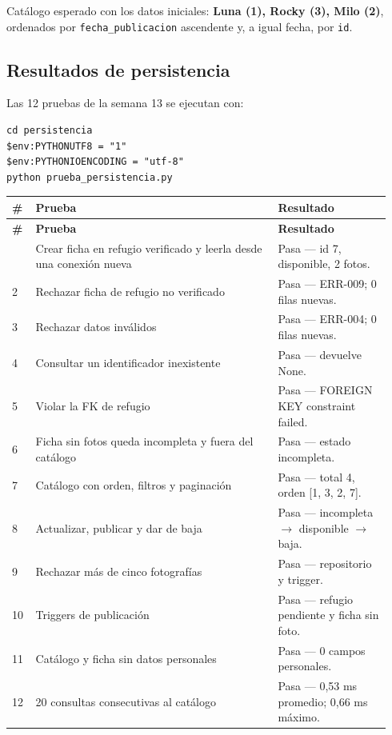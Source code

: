 \documentclass[11pt,a4paper]{article}
\newcommand{\code}[1]{\texttt{#1}}
\newcommand{\thead}[1]{\textbf{#1}}
\begin{document}
Catálogo esperado con los datos iniciales: \textbf{Luna (1), Rocky (3), Milo
(2)}, ordenados por \code{fecha\_publicacion} ascendente y, a igual fecha, por
\code{id}.

\subsection{Resultados de persistencia}

Las 12 pruebas de la semana 13 se ejecutan con:

\begin{lstlisting}
cd persistencia
$env:PYTHONUTF8 = "1"
$env:PYTHONIOENCODING = "utf-8"
python prueba_persistencia.py
\end{lstlisting}

{\footnotesize
\begin{longtable}{@{}A{0.05\linewidth}L{0.60\linewidth}L{0.29\linewidth}@{}}
\toprule
\thead{\#} & \thead{Prueba} & \thead{Resultado} \\ \midrule \endfirsthead
\thead{\#} & \thead{Prueba} & \thead{Resultado} \\ \midrule \endhead
\bottomrule
{} & Crear ficha en refugio verificado y leerla desde una conexión nueva &
Pasa --- id 7, disponible, 2 fotos. \\
2 & Rechazar ficha de refugio no verificado &
Pasa --- ERR-009; 0 filas nuevas. \\
3 & Rechazar datos inválidos & Pasa --- ERR-004; 0 filas nuevas. \\
4 & Consultar un identificador inexistente & Pasa --- devuelve None. \\
5 & Violar la FK de refugio &
Pasa --- FOREIGN KEY constraint failed. \\
6 & Ficha sin fotos queda incompleta y fuera del catálogo &
Pasa --- estado incompleta. \\
7 & Catálogo con orden, filtros y paginación &
Pasa --- total 4, orden [1, 3, 2, 7]. \\
8 & Actualizar, publicar y dar de baja &
Pasa --- incompleta $\rightarrow$ disponible $\rightarrow$ baja. \\
9 & Rechazar más de cinco fotografías &
Pasa --- repositorio y trigger. \\
10 & Triggers de publicación &
Pasa --- refugio pendiente y ficha sin foto. \\
11 & Catálogo y ficha sin datos personales & Pasa --- 0 campos personales. \\
12 & 20 consultas consecutivas al catálogo &
Pasa --- 0,53 ms promedio; 0,66 ms máximo. \\
\end{longtable}
}
\end{document}
